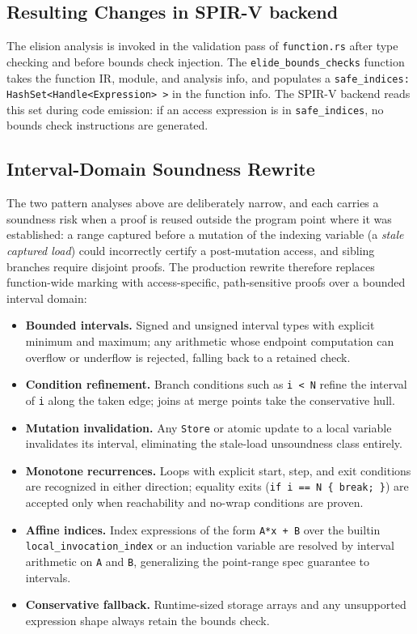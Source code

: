 \documentclass[11pt,a4paper]{article}
\begin{document}
\subsection{Resulting Changes  in SPIR-V backend}

The elision analysis is invoked in the validation pass of
\texttt{function.rs} after type checking and before bounds check injection.
The \texttt{elide\_bounds\_checks} function takes the function IR, module,
and analysis info, and populates a
\texttt{safe\_indices: HashSet<Handle<Expression>\,>} in the function info. The
SPIR-V backend reads this set during code emission: if an access expression
is in \texttt{safe\_indices}, no bounds check instructions are generated.

\subsection{Interval-Domain Soundness Rewrite}
\label{sec:interval_domain}

The two pattern analyses above are deliberately narrow, and each carries a
soundness risk when a proof is reused outside the program point where it
was established: a range captured before a mutation of the indexing
variable (a \emph{stale captured load}) could incorrectly certify a
post-mutation access, and sibling branches require disjoint proofs. The
production rewrite therefore replaces function-wide marking with
access-specific, path-sensitive proofs over a bounded interval domain:

\begin{itemize}
  \item \textbf{Bounded intervals.} Signed and unsigned interval types with
  explicit minimum and maximum; any arithmetic whose endpoint computation
  can overflow or underflow is rejected, falling back to a retained check.
  \item \textbf{Condition refinement.} Branch conditions such as
  \texttt{i < N} refine the interval of \texttt{i} along the taken edge;
  joins at merge points take the conservative hull.
  \item \textbf{Mutation invalidation.} Any \texttt{Store} or atomic update
  to a local variable invalidates its interval, eliminating the stale-load
  unsoundness class entirely.
  \item \textbf{Monotone recurrences.} Loops with explicit start, step, and
  exit conditions are recognized in either direction; equality exits
  (\texttt{if i == N \{ break; \}}) are accepted only when reachability and
  no-wrap conditions are proven.
  \item \textbf{Affine indices.} Index expressions of the form
  \texttt{A*x + B} over the builtin \texttt{local\_invocation\_index} or an
  induction variable are resolved by interval arithmetic on \texttt{A} and
  \texttt{B}, generalizing the point-range spec guarantee to intervals.
  \item \textbf{Conservative fallback.} Runtime-sized storage arrays and any
  unsupported expression shape always retain the bounds check.
\end{itemize}
\end{document}
